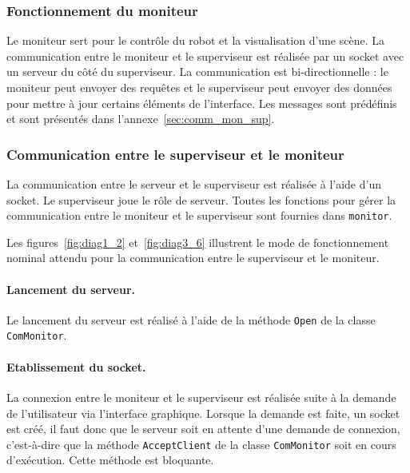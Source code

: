 \subsubsection{Fonctionnement du moniteur}

Le moniteur sert pour le contrôle du robot et la visualisation d'une scène. La communication entre le moniteur et le superviseur est réalisée par un socket avec un serveur du côté du superviseur. La communication est bi-directionnelle : le moniteur peut envoyer des requêtes et le superviseur peut envoyer des données pour mettre à jour certains éléments de l'interface. Les messages sont prédéfinis et sont présentés dans l'annexe~\ref{sec:comm_mon_sup}.


  \subsubsection{Communication entre le superviseur et le moniteur}

La communication entre le serveur et le superviseur est réalisée à l'aide d'un socket. Le superviseur joue le rôle de serveur. Toutes les fonctions pour gérer la communication entre le moniteur et le superviseur sont fournies dans {\tt monitor}.

Les figures~\ref{fig:diag1_2} et~\ref{fig:diag3_6}  illustrent le mode de fonctionnement nominal attendu pour la communication entre le superviseur et le moniteur.


\paragraph{Lancement du serveur.} Le lancement du serveur est réalisé à l'aide de la méthode {\tt Open} de la classe {\tt ComMonitor}.\\



\paragraph{Etablissement du socket.} La connexion entre le moniteur et le superviseur est réalisée suite à la demande de l'utilisateur via l'interface graphique. Lorsque la demande est faite, un socket est créé, il faut donc que le serveur soit en attente d'une demande de connexion, c'est-à-dire que la méthode {\tt AcceptClient} de la classe {\tt ComMonitor} soit en cours d'exécution. Cette méthode est bloquante.\\

